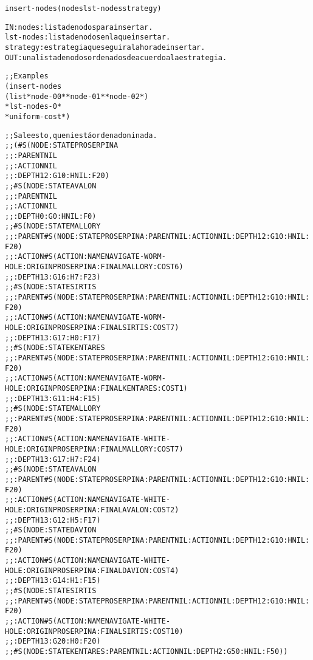\begin{aibox}{\function}
\begin{alltt}
insert-nodes (nodes lst-nodes strategy)


IN: 	nodes: lista de nodos para insertar.
	lst-nodes:	lista de nodos en la que insertar.
	strategy:	estrategia que seguir a la hora de insertar.
OUT:	una lista de nodos ordenados de acuerdo a la estrategia.

\end{alltt}
\end{aibox}

\begin{aibox}{\examples}
\begin{alltt}
;; Examples
(insert-nodes 
	(list *node-00* *node-01* *node-02*) 
	*lst-nodes-0*
	*uniform-cost*)

;;Sale esto, que ni está ordenado ni nada.
;;(\#S(NODE :STATE PROSERPINA 
;;	:PARENT NIL
;;	:ACTION NIL
;;	:DEPTH 12 :G 10 :H NIL :F 20)
;; \#S(NODE :STATE AVALON 
;;	:PARENT NIL
;;	:ACTION NIL
;;	:DEPTH 0 :G 0 :H NIL :F 0)
;; \#S(NODE :STATE MALLORY
;;	:PARENT \#S(NODE :STATE PROSERPINA :PARENT NIL :ACTION NIL :DEPTH 12 :G 10 :H NIL :F 20)
;;	:ACTION \#S(ACTION :NAME NAVIGATE-WORM-HOLE :ORIGIN PROSERPINA :FINAL MALLORY :COST 6)
;;	:DEPTH 13 :G 16 :H 7 :F 23)
;; \#S(NODE :STATE SIRTIS
;;	:PARENT \#S(NODE :STATE PROSERPINA :PARENT NIL :ACTION NIL :DEPTH 12 :G 10 :H NIL :F 20)
;;	:ACTION \#S(ACTION :NAME NAVIGATE-WORM-HOLE :ORIGIN PROSERPINA :FINAL SIRTIS :COST 7)
;;	:DEPTH 13 :G 17 :H 0 :F 17)
;; \#S(NODE :STATE KENTARES
;;	:PARENT \#S(NODE :STATE PROSERPINA :PARENT NIL :ACTION NIL :DEPTH 12 :G 10 :H NIL :F 20)
;;	:ACTION \#S(ACTION :NAME NAVIGATE-WORM-HOLE :ORIGIN PROSERPINA :FINAL KENTARES :COST 1)
;;	:DEPTH 13 :G 11 :H 4 :F 15)
;; \#S(NODE :STATE MALLORY
;;	:PARENT \#S(NODE :STATE PROSERPINA :PARENT NIL :ACTION NIL :DEPTH 12 :G 10 :H NIL :F 20)
;;	:ACTION \#S(ACTION :NAME NAVIGATE-WHITE-HOLE :ORIGIN PROSERPINA :FINAL MALLORY :COST 7)
;;	:DEPTH 13 :G 17 :H 7 :F 24)
;; \#S(NODE :STATE AVALON
;;	:PARENT \#S(NODE :STATE PROSERPINA :PARENT NIL :ACTION NIL :DEPTH 12 :G 10 :H NIL :F 20)
;;	:ACTION \#S(ACTION :NAME NAVIGATE-WHITE-HOLE :ORIGIN PROSERPINA :FINAL AVALON :COST 2)
;;	:DEPTH 13 :G 12 :H 5 :F 17)
;; \#S(NODE :STATE DAVION
;;	:PARENT \#S(NODE :STATE PROSERPINA :PARENT NIL :ACTION NIL :DEPTH 12 :G 10 :H NIL :F 20)
;;	:ACTION \#S(ACTION :NAME NAVIGATE-WHITE-HOLE :ORIGIN PROSERPINA :FINAL DAVION :COST 4)
;;	:DEPTH 13 :G 14 :H 1 :F 15)
;; \#S(NODE :STATE SIRTIS
;;	:PARENT \#S(NODE :STATE PROSERPINA :PARENT NIL :ACTION NIL :DEPTH 12 :G 10 :H NIL :F 20)
;;	:ACTION \#S(ACTION :NAME NAVIGATE-WHITE-HOLE :ORIGIN PROSERPINA :FINAL SIRTIS :COST 10)
;;	:DEPTH 13 :G 20 :H 0 :F 20)
;; \#S(NODE :STATE KENTARES :PARENT NIL :ACTION NIL :DEPTH 2 :G 50 :H NIL :F 50))



\end{alltt}
\end{aibox}

